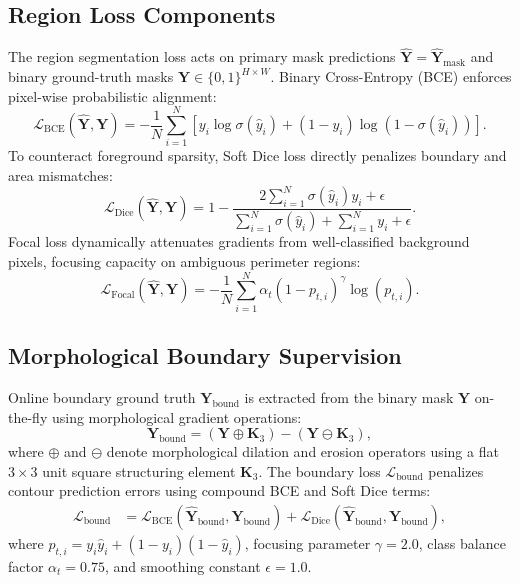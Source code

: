\documentclass{ieeeaccess}
\begin{document}
\subsection{Region Loss Components}
The region segmentation loss acts on primary mask predictions $\hat{\mathbf{Y}} = \hat{\mathbf{Y}}_{\text{mask}}$ and binary ground-truth masks $\mathbf{Y} \in \{0, 1\}^{H \times W}$. Binary Cross-Entropy (BCE) enforces pixel-wise probabilistic alignment:
\begin{equation}
  \mathcal{L}_{\text{BCE}}(\hat{\mathbf{Y}}, \mathbf{Y}) = -\frac{1}{N}\sum_{i=1}^{N} \left[ y_i \log \sigma(\hat{y}_i) + (1 - y_i)\log (1 - \sigma(\hat{y}_i)) \right].
\end{equation}
To counteract foreground sparsity, Soft Dice loss directly penalizes boundary and area mismatches:
\begin{equation}
  \mathcal{L}_{\text{Dice}}(\hat{\mathbf{Y}}, \mathbf{Y}) = 1 - \frac{2 \sum_{i=1}^{N} \sigma(\hat{y}_i) y_i + \epsilon}{\sum_{i=1}^{N} \sigma(\hat{y}_i) + \sum_{i=1}^{N} y_i + \epsilon}.
\end{equation}
Focal loss dynamically attenuates gradients from well-classified background pixels, focusing capacity on ambiguous perimeter regions:
\begin{equation}
  \mathcal{L}_{\text{Focal}}(\hat{\mathbf{Y}}, \mathbf{Y}) = -\frac{1}{N}\sum_{i=1}^{N} \alpha_t (1 - p_{t, i})^\gamma \log(p_{t, i}).
\end{equation}

\subsection{Morphological Boundary Supervision}
Online boundary ground truth $\mathbf{Y}_{\text{bound}}$ is extracted from the binary mask $\mathbf{Y}$ on-the-fly using morphological gradient operations:
\begin{equation}
  \mathbf{Y}_{\text{bound}} = \left(\mathbf{Y} \oplus \mathbf{K}_3\right) - \left(\mathbf{Y} \ominus \mathbf{K}_3\right),
\end{equation}
where $\oplus$ and $\ominus$ denote morphological dilation and erosion operators using a flat $3 \times 3$ unit square structuring element $\mathbf{K}_3$. The boundary loss $\mathcal{L}_{\text{bound}}$ penalizes contour prediction errors using compound BCE and Soft Dice terms:
\begin{align}
  \mathcal{L}_{\text{bound}} &= \mathcal{L}_{\text{BCE}}(\hat{\mathbf{Y}}_{\text{bound}}, \mathbf{Y}_{\text{bound}}) + \mathcal{L}_{\text{Dice}}(\hat{\mathbf{Y}}_{\text{bound}}, \mathbf{Y}_{\text{bound}}), \label{eq:loss_bound}
\end{align}
where $p_{t, i} = y_i \hat{y}_i + (1 - y_i)(1 - \hat{y}_i)$, focusing parameter $\gamma = 2.0$, class balance factor $\alpha_t = 0.75$, and smoothing constant $\epsilon = 1.0$.
\end{document}
